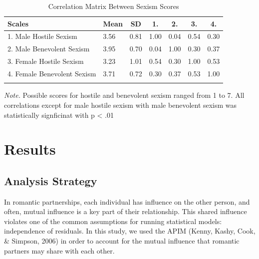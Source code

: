 \documentclass[
  english,
  man]{apa6}
\begin{document}
\begin{table}[tbp]

\begin{center}
\begin{threeparttable}

\caption{\label{tab:unnamed-chunk-2}Correlation Matrix Between Sexism Scores}

\begin{tabular}{lllllll}
\toprule
Scales & \multicolumn{1}{c}{Mean} & \multicolumn{1}{c}{SD} & \multicolumn{1}{c}{1.} & \multicolumn{1}{c}{2.} & \multicolumn{1}{c}{3.} & \multicolumn{1}{c}{4.}\\
\midrule
1. Male Hostile Sexism & 3.56 & 0.81 & 1.00 & 0.04 & 0.54 & 0.30\\
2. Male Benevolent Sexism & 3.95 & 0.70 & 0.04 & 1.00 & 0.30 & 0.37\\
3. Female Hostile Sexism & 3.23 & 1.01 & 0.54 & 0.30 & 1.00 & 0.53\\
4. Female Benevolent Sexism & 3.71 & 0.72 & 0.30 & 0.37 & 0.53 & 1.00\\
\bottomrule
\addlinespace
\end{tabular}

\begin{tablenotes}[para]
\normalsize{\textit{Note.} Possible scores for hostile and benevolent sexism ranged from 1 to 7. All correlations except for male hostile sexism with male benevolent sexism was statistically signficinat with p < .01}
\end{tablenotes}

\end{threeparttable}
\end{center}

\end{table}

\hypertarget{results}{%
\section{Results}\label{results}}

\hypertarget{analysis-strategy}{%
\subsection{Analysis Strategy}\label{analysis-strategy}}

In romantic partnerships, each individual has influence on the other person, and often, mutual influence is a key part of their relationship. This shared influence violates one of the common assumptions for running statistical models: independence of residuals. In this study, we used the APIM (Kenny, Kashy, Cook, \& Simpson, 2006) in order to account for the mutual influence that romantic partners may share with each other.
\end{document}
